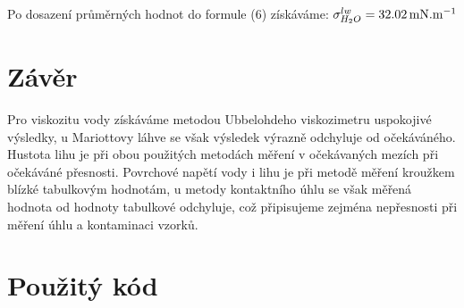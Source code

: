\documentclass[czech,11pt,a4paper]{article}
\begin{document}
   Po dosazení průměrných hodnot do formule (6) získáváme: $\sigma ^{lw}_{H_2O} = 32.02 \,\rm mN.m^{-1}$
   
	
	\section{Závěr}
	Pro viskozitu vody získáváme metodou Ubbelohdeho viskozimetru uspokojivé výsledky, u Mariottovy láhve se však výsledek výrazně odchyluje od očekáváného. Hustota lihu je při obou použitých metodách měření v očekávaných mezích při očekáváné přesnosti. Povrchové napětí vody i lihu je při metodě měření kroužkem blízké tabulkovým hodnotám, u metody kontaktního úhlu se však měřená hodnota od hodnoty tabulkové odchyluje, což připisujeme zejména nepřesnosti při měření úhlu a kontaminaci vzorků.
	
	
	\section{Použitý kód}
\end{document}
